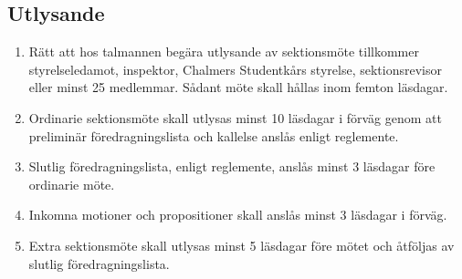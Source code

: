 \documentclass[11pt,a4paper]{article}
\begin{document}
\subsection{Utlysande}
\begin{enumerate}[\thesubsection.1]\label{subsec:utlysande}

  \item Rätt att hos talmannen begära utlysande av
  sek\-tions\-möte tillkommer styrelseledamot, inspektor,  Chalmers Studentkårs styrelse, sek\-ti\-ons\-revisor  eller minst 25 medlemmar. Sådant möte skall hållas inom femton läsdagar.

  \item Ordinarie sektionsmöte skall utlysas minst 10 läsdagar i
  förväg genom att preliminär föredragningslista och kallelse an\-slås enligt
  reglemente. 
  
  \item Slutlig föredragningslista, enligt reglemente, anslås minst 3 läsdagar före ordinarie möte. 
  
  \item Inkomna motioner och propositioner skall anslås
  minst 3 läsdagar i förväg.
  
  \item Extra sektionsmöte skall utlysas minst 5 läsdagar före mötet
  och åt\-följ\-as av slutlig föredragningslista.

\end{enumerate}
\end{document}
